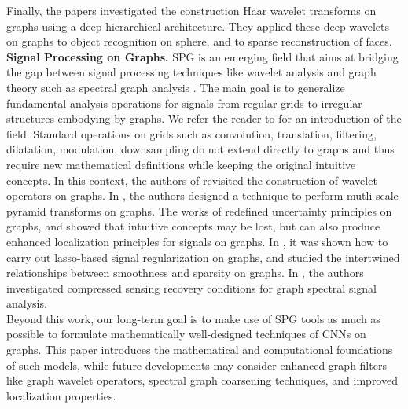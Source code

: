 \documentclass{article}
\begin{document}
Finally, the papers \cite{pro:ChenChengMallat14deepHaar,pro:RustamovGuibas14deepHaar} investigated the construction Haar wavelet transforms on graphs using a deep hierarchical architecture. They applied these deep wavelets on graphs to object recognition on sphere, and to sparse reconstruction of faces. \\
{\bf Signal Processing on Graphs.} SPG is an emerging field that aims at bridging the gap between signal processing techniques like wavelet analysis and graph theory such as spectral graph analysis \cite{art:BelkinNiyogi05LaplaBeltrami,art:VonLuxburg07Tutorial}. The main goal is to generalize fundamental analysis operations for signals from regular grids to irregular structures embodying by graphs. We refer the reader to \cite{art:ShumanNarangFrossardOrtegaVandergheynst13ReviewSPG} for an introduction of the field. Standard operations on grids such as convolution, translation, filtering, dilatation, modulation, downsampling do not extend directly to graphs and thus require new mathematical definitions while keeping the original intuitive concepts. In this context, the authors of \cite{art:HammondVandergheynstGribonval11GraphWav,art:CoifmanLafon06DifMap,pro:GavishNadlerCoifman10GraphHaar} revisited the construction of wavelet operators on graphs. In \cite{art:ShumanFarajiVandergheynst16PyramTrans,art:RamEladCohen11TreeWavelets}, the authors designed a technique to perform mutli-scale pyramid transforms on graphs. The works of \cite{pro:TsitsveroBarbarossa15Uncert,pro:PasdeloupAlamiGriponRabbat15Uncert,art:PerraudinRicaudShumanVandergheynst16Uncert} redefined uncertainty principles on graphs, and showed that intuitive concepts may be lost, but can also produce enhanced localization principles for signals on graphs. In \cite{pro:HammondRaoaroorJacquesVandergheynst10LassoGraWav}, it was shown how to carry out lasso-based signal regularization on graphs, and studied the intertwined relationships between smoothness and sparsity on graphs. In \cite{pro:TremblayPuyGribonvalVandergheynst16CompSpecClus}, the authors investigated compressed sensing recovery conditions for graph spectral signal analysis. \\
Beyond this work, our long-term goal is to make use of SPG tools as much as possible to formulate mathematically well-designed techniques of CNNs on graphs. This paper introduces the mathematical and computational foundations of such models, while future developments may consider enhanced graph filters like graph wavelet operators, spectral graph coarsening techniques, and improved localization properties.
\end{document}
